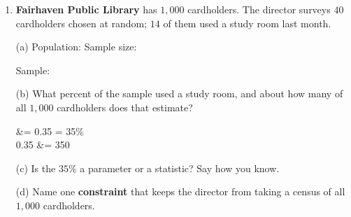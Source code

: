 \documentclass[10pt]{article}
\begin{document}
\begin{enumerate}[leftmargin=2.2em, itemsep=9pt, topsep=2pt]
\vspace{4pt}
(b) Write a \textbf{conclusion in context} about the most common method, naming the group it
applies to.

\par{}
\par{}

\vspace{2pt}
(c) All $40$ students were asked while they waited in the bus line. At which \textbf{stage of
the data cycle} did the problem enter, and why that stage?

\par{}
\par{}

\boxguard[22]
\item \textbf{Fairhaven Public Library} has $1{,}000$ cardholders. The director surveys $40$
cardholders chosen at random; $14$ of them used a study room last month.

\vspace{2pt}
(a) Population:  \quad Sample size: 

\vspace{3pt}
Sample: 

\vspace{3pt}
(b) What percent of the sample used a study room, and about how many of all $1{,}000$
cardholders does that estimate?

\begin{work}
   &= 0.35 = 35\% \\
  0.35  &= 350 
\end{work}

(c) Is the $35\%$ a parameter or a statistic? Say how you know.

\par{}

(d) Name one \textbf{constraint} that keeps the director from taking a census of all $1{,}000$
cardholders.

\par{}


\end{enumerate}
\end{document}
